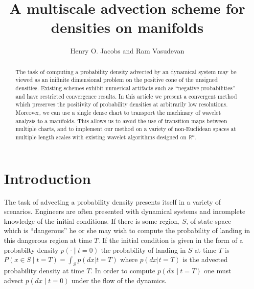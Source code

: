 \documentclass[letterpaper, 10 pt, conference]{ieeeconf}
\title{\LARGE \bf
  A 
  multiscale
  advection scheme for
  densities on manifolds
}
\author{Henry O. Jacobs and Ram Vasudevan}%
\newcommand{\R}{\mathbb{R}}
\begin{document}
\maketitle
\thispagestyle{empty}
\pagestyle{empty}


\begin{abstract}
  The task of computing a probability density advected by an 
  dynamical system may be viewed as an inifinite dimensional problem
  on the positive cone of the unsigned densities.
  Existing schemes exhibit numerical artifacts such as
  ``negative probabilities'' and have restricted convergence results.
  In this article we present a convergent method
  which preserves the positivity of probability densities
  at arbitrarily low resolutions.
  Moreover, we can use a single dense chart to transport the machinary of wavelet analysis to a manifolds.
  This allows us to avoid the use of transition maps between multiple charts, and to implement our method on a variety of non-Euclidean spaces at multiple length scales with existing wavelet algorithms designed on $\R^n$.
\end{abstract}


\section{Introduction}
  The task of advecting a probability density presents itself
  in a variety of scenarios.
  Engineers are often presented
  with dynamical systems and incomplete knowledge
  of the initial conditions.
  If there is some region, $S$, of state-space which is ``dangerous''
  he or she may wish to compute the probability of landing
  in this dangerous region at time $T$.
  If the initial condition is given in the form of a
  probabilty density $p(\cdot \mid t=0)$
  the probability of landing in $S$ at time $T$
  is $P( x \in S \mid t = T)  = \int_S p( dx | t=T )$
  where $p(dx|t=T)$ is the advected probability density at time $T$.
  In order to compute $p(dx\mid t=T)$
  one must advect $p(dx\mid t=0)$ under the flow of the dynamics.
\end{document}
